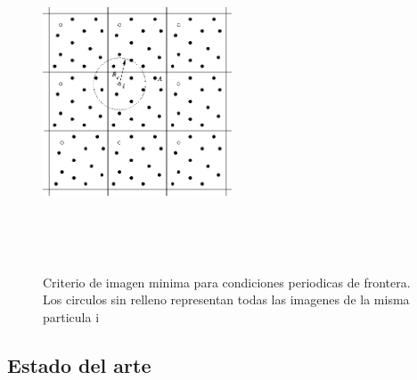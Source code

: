\documentclass[a4paper,10pt]{report}
\begin{document}
\begin{figure}[!ht]
\centering
\includegraphics[keepaspectratio, height=10cm ,width=0.5\textwidth]{img/minimage.png}
\caption{Criterio de imagen minima para condiciones periodicas de frontera. Los circulos sin relleno representan todas las imagenes de la misma particula i}
\label{minimage}
\end{figure}















\subsection{Estado del arte}


\end{document}
